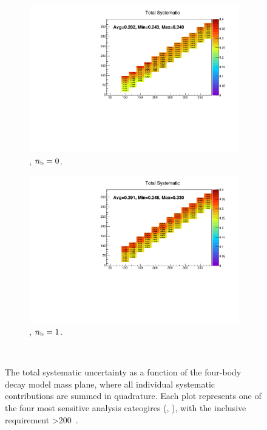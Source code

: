 \begin{figure}[h!]
  \begin{subfigure}[b]{0.47\textwidth}
    \includegraphics[width=\textwidth]{Figs/sms/t2degen/v19/systs/total_T2_4body_eq0b_ge4j_incl.pdf}
    \caption{\njhigh, $n_{\text{b}} = 0$.}
  \end{subfigure}
  \begin{subfigure}[b]{0.47\textwidth}
    \includegraphics[width=\textwidth]{Figs/sms/t2degen/v19/systs/total_T2_4body_eq1b_ge4j_incl.pdf}
    \caption{\njhigh, $n_{\text{b}} = 1$.}
  \end{subfigure}\\
  \caption{The total systematic uncertainty as a function of the four-body decay
  model mass plane,
  where all individual systematic contributions are summed in quadrature.
  Each plot represents one of the four most sensitive 
  analysis cateogires (\nb, \nj), with the inclusive requirement \HT>200~\gev.}
  \label{fig:sms-totalsyst-t2degen}
\end{figure}
